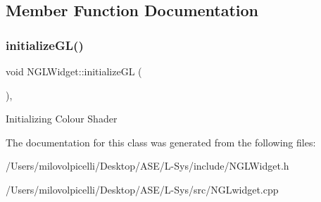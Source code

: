 \subsection{Member Function Documentation}
\mbox{\label{class_n_g_l_widget_ac31af2f94e34f15d050247d2c07cb10a}} 
\subsubsection{\texorpdfstring{initialize\+G\+L()}{initializeGL()}}
{\footnotesize\ttfamily void N\+G\+L\+Widget\+::initialize\+GL (\begin{DoxyParamCaption}{ }\end{DoxyParamCaption})\hspace{0.3cm}{\ttfamily [override]}, {\ttfamily [protected]}}

Initializing Colour Shader 

The documentation for this class was generated from the following files\+:\begin{DoxyCompactItemize}
\item 
/\+Users/milovolpicelli/\+Desktop/\+A\+S\+E/\+L-\/\+Sys/include/N\+G\+L\+Widget.\+h\item 
/\+Users/milovolpicelli/\+Desktop/\+A\+S\+E/\+L-\/\+Sys/src/N\+G\+Lwidget.\+cpp\end{DoxyCompactItemize}
